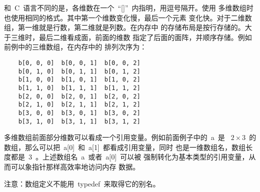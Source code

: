 和~C~语言不同的是，各维数在一个~``[]''~内指明，用逗号隔开。使用
多维数组时也使用相同的格式。其中第一个维数变化慢，最后一个元素
变化快。对于二维数组，第一维就是行数，第二维就是列数。在内存中
的存储布局是按行存储的。大于三维时，最后二维看成面，前面的维数
指定了后面的面阵，并顺序存储。例如前例中的三维数组，在内存中的
排列次序为：
\ttfamily
\begin{lstlisting}
    b[0, 0, 0]  b[0, 0, 1]  b[0, 0, 2]
    b[0, 1, 0]  b[0, 1, 1]  b[0, 1, 2]
    b[1, 0, 0]  b[1, 0, 1]  b[1, 0, 2]
    b[1, 1, 0]  b[1, 1, 1]  b[1, 1, 2]
    b[2, 0, 0]  b[2, 0, 1]  b[2, 0, 2]
    b[2, 1, 0]  b[2, 1, 1]  b[2, 1, 2]
    b[3, 0, 0]  b[3, 0, 1]  b[3, 0, 2]
    b[3, 1, 0]  b[3, 1, 1]  b[3, 1, 2]
\end{lstlisting}

多维数组前面部分维数可以看成一个引用变量。例如前面例子中的~a~是
~$2\times 3$~的数组，那么可以把~a[0]~和~a[1]~都看成引用变量，同时
也是一维数组名，数组长度都是~3~。上述数组名~a~或者~a[0]~可以被
强制转化为基本类型的引用变量，从而可以象指针那样高效率地访问内存
数据。

注意：数组定义不能用~typedef~来取得它的别名。

